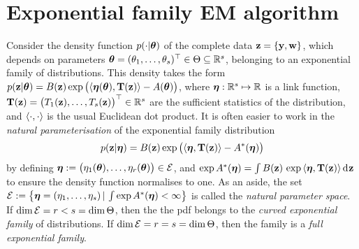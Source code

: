 \section{Exponential family EM algorithm}
\label{apx:expem}

Consider the density function $p(\cdot|{\bm\theta})$ of the complete data ${\mathbf z} = \{{\mathbf y},{\mathbf w}\}$, which depends on parameters ${\bm\theta} = (\theta_1,\dots,\theta_s)^\top \in\Theta\subseteq\mathbb{R}^s$, belonging to an exponential family of distributions.
This density takes the form $p({\mathbf z}|{\bm\theta}) = B({\mathbf z}) \exp \big( \langle{\bm\eta}({\bm\theta}), {\mathbf T}({\mathbf z})\rangle -  A({\bm\theta}) \big)$, where ${\bm\eta}:\mathbb{R}^s \mapsto \mathbb{R}$ is a link function,  ${\mathbf T}({\mathbf z}) = \big(T_1({\mathbf z}),\dots,T_s({\mathbf z})\big)^\top \in \mathbb{R}^s$ are the sufficient statistics of the distribution, and $\langle\cdot,\cdot\rangle$ is the usual Euclidean dot product.
It is often easier to work in the \emph{natural parameterisation} of the exponential family distribution 
\begin{align}\label{eq:pdfexpfamnat}
  p({\mathbf z}|{\bm\eta}) = B({\mathbf z}) \exp \big( \langle{\bm\eta}, {\mathbf T}({\mathbf z})\rangle -  A^*({\bm\eta}) \big)
\end{align}
by defining ${\bm\eta} := \big(\eta_1({\bm\theta}),\dots,\eta_r({\bm\theta})\big) \in {\mathcal E}$, and $\exp A^*({\bm\eta}) = \int B({\mathbf z}) \, \exp \, \langle{\bm\eta}, {\mathbf T}({\mathbf z})\rangle  \operatorname{d}\hspace{0.5pt}\! {\mathbf z}$ to ensure the density function normalises to one.
As an aside, the set ${\mathcal E} := \big\{ {\bm\eta} = (\eta_1,\dots,\eta_s) \,|\, \int  \exp A^*({\bm\eta}) < \infty \big\}$ is called the \emph{natural parameter space}.
If $\dim {\mathcal E} = r < s = \dim \Theta$, then the the pdf belongs to the \emph{curved exponential family} of distributions.
If $\dim {\mathcal E} = r = s = \dim \Theta$, then the family is a \emph{full exponential family}.

